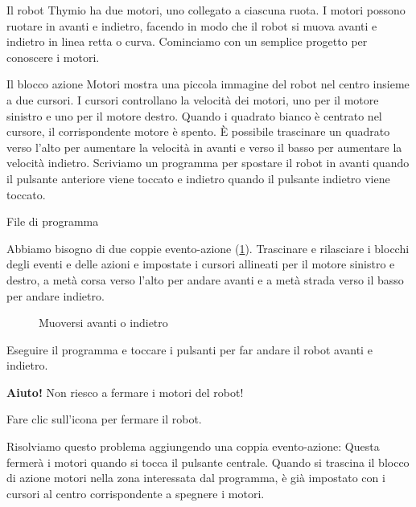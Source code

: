 
\label{ch.moving}


Il robot Thymio ha due motori, uno collegato a ciascuna ruota. I
motori possono ruotare in avanti e indietro, facendo in modo che il robot si muova
avanti e indietro in linea retta o curva. Cominciamo con un semplice
progetto per conoscere i motori.

Il blocco azione Motori   mostra una piccola immagine del
robot nel centro insieme a due cursori. I cursori controllano la
velocità dei motori, uno per il motore sinistro e uno per il motore destro. Quando i quadrato bianco è centrato nel cursore, il
corrispondente motore è spento. È possibile trascinare un quadrato verso l'alto per aumentare la
velocità in avanti e verso il basso per aumentare la velocità indietro.
Scriviamo un programma per spostare il robot in avanti quando il pulsante anteriore
viene toccato e indietro quando il pulsante indietro viene toccato.

{\raggedleft \hfill File di programma }

Abbiamo bisogno di due coppie evento-azione (\cref{fig.nostop}). Trascinare e rilasciare
i blocchi degli eventi e delle azioni e impostate i cursori allineati per il motore sinistro e destro, a metà corsa verso l'alto per andare avanti e a metà strada verso il basso per andare indietro.

\begin{figure}
\begin{center}
\caption{Muoversi avanti o indietro}\label{fig.nostop}
\end{center}
\end{figure}


Eseguire il programma e toccare i pulsanti per
far andare il robot avanti e indietro.

\newpage


\textbf{Aiuto!} Non riesco a fermare i motori del robot!

Fare clic sull'icona  per fermare il robot.

Risolviamo questo problema aggiungendo una coppia evento-azione: 
Questa fermerà i motori quando si tocca il pulsante centrale. Quando si
trascina il blocco di azione motori nella zona interessata dal programma, è già impostato
con i cursori al centro corrispondente a spegnere i motori.

